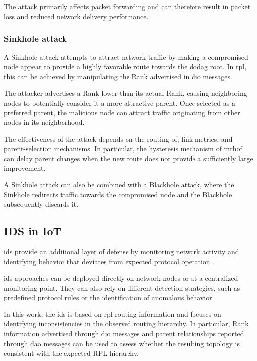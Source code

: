 The attack primarily affects packet forwarding and can therefore result in packet loss and reduced network delivery performance.

\subsubsection{Sinkhole attack}
A Sinkhole attack attempts to attract network traffic by making a compromised node appear to provide a highly favorable route towards the \gls{dodag} root. 
In \gls{rpl}, this can be achieved by manipulating the Rank advertised in \gls{dio} messages.

The attacker advertises a Rank lower than its actual Rank, causing neighboring nodes to potentially consider it a more attractive parent. 
Once selected as a preferred parent, the malicious node can attract traffic originating from other nodes in its neighborhood.

The effectiveness of the attack depends on the routing \gls{of}, link metrics, and parent-selection mechanisms. 
In particular, the hysteresis mechanism of \gls{mrhof} can delay parent changes when the new route does not provide a sufficiently large improvement.

A Sinkhole attack can also be combined with a Blackhole attack, where the Sinkhole redirects traffic towards the compromised node and the Blackhole subsequently discards it.

\subsection{IDS in IoT}
\label{subsec:ids_background}
\gls{ids} provide an additional layer of defense by monitoring network activity and identifying behavior that deviates from expected protocol operation.

\gls{ids} approaches can be deployed directly on network nodes or at a centralized monitoring point. 
They can also rely on different detection strategies, such as predefined protocol rules or the identification of anomalous behavior.

In this work, the \gls{ids} is based on \gls{rpl} routing information and focuses on identifying inconsistencies in the observed routing hierarchy. 
In particular, Rank information advertised through \gls{dio} messages and parent relationships reported through \gls{dao} messages can be used to assess whether the resulting topology is consistent with the expected RPL hierarchy.